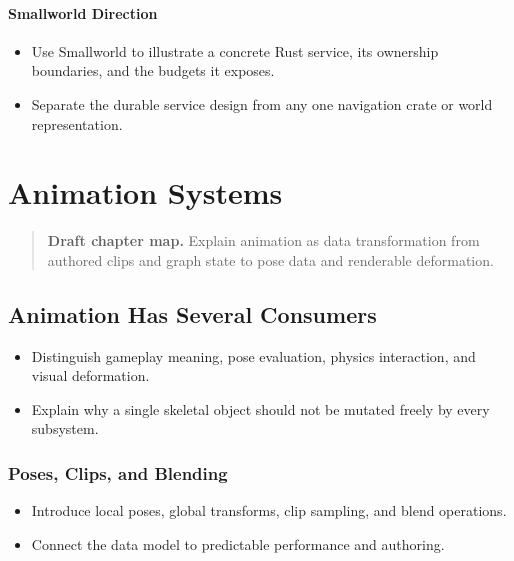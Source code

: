 \documentclass[
  11pt,
  letterpaper,
  DIV=11,
  numbers=noendperiod,
  twoside,
  open=right]{scrreprt}
\providecommand{\tightlist}{%
  \setlength{\itemsep}{0pt}\setlength{\parskip}{0pt}}
\begin{document}
\subsubsection{Smallworld Direction}\label{smallworld-direction}

\begin{itemize}
\tightlist
\item
  Use Smallworld to illustrate a concrete Rust service, its ownership
  boundaries, and the budgets it exposes.
\item
  Separate the durable service design from any one navigation crate or
  world representation.
\end{itemize}

\chapter{Animation Systems}\label{animation-systems}

\begin{quote}
\textbf{Draft chapter map.} Explain animation as data transformation
from authored clips and graph state to pose data and renderable
deformation.
\end{quote}

\section{Animation Has Several
Consumers}\label{animation-has-several-consumers}

\begin{itemize}
\tightlist
\item
  Distinguish gameplay meaning, pose evaluation, physics interaction,
  and visual deformation.
\item
  Explain why a single skeletal object should not be mutated freely by
  every subsystem.
\end{itemize}

\subsection{Poses, Clips, and Blending}\label{poses-clips-and-blending}

\begin{itemize}
\tightlist
\item
  Introduce local poses, global transforms, clip sampling, and blend
  operations.
\item
  Connect the data model to predictable performance and authoring.
\end{itemize}
\end{document}
